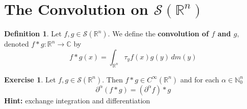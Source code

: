 \documentclass{book}
\theoremstyle{definition}
\newtheorem{defn}[definition]{Definition}
\newtheorem{ex}[definition]{Exercise}
\newcommand{\al}{\alpha}
\newcommand{\C}{\mathbb{C}}
\newcommand{\N}{\mathbb{N}}
\newcommand{\R}{\mathbb{R}}
\newcommand{\MS}{\mathcal{S}}
\DeclareMathOperator*{\0}{\mbf{0}}
\DeclareMathOperator*{\1}{\mbf{1}}
\newcommand{\tbf}[1]{\textbf{#1}}
\newcommand{\p}{\partial}
\newcommand{\dm}{\, d m}
\begin{document}
\newpage
\section{The Convolution on $\MS(\R^n)$}

	\begin{defn}
		Let $f, g \in \MS(\R^n)$. We define the \textbf{convolution of $f$ and $g$}, denoted $f * g: \R^n \rightarrow \C$ by $$f*g(x) = \int_{\R^n} \tau_yf(x) g(y) \dm(y)$$
	\end{defn}

	\begin{ex}
		Let $f,g \in \MS(\R^n)$. Then $f*g \in C^{\infty}(\R^n)$ and for each $\al \in \N_0^n$
		$$\p^{\al}(f*g) = (\p^{\al}f)*g$$ 
		\tbf{Hint:} exchange integration and differentiation
	\end{ex}
\end{document}
